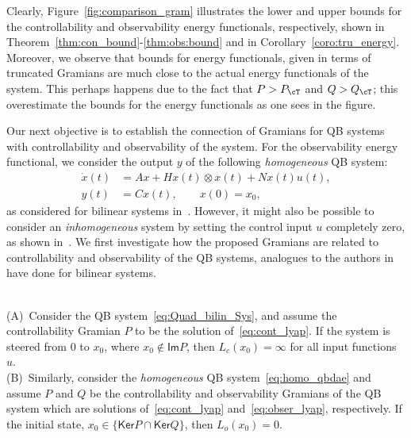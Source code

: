 \begin{example}
Clearly, Figure~\ref{fig:comparison_gram} illustrates the lower and upper bounds for the controllability and observability energy functionals, respectively, shown in Theorem~\ref{thm:con_bound}-\ref{thm:obs:bound} and in Corollary~\ref{coro:tru_energy}. Moreover, we observe that bounds for energy functionals, given in terms of truncated Gramians are much close to the actual energy functionals of the system. This perhaps happens due to the fact that $P > P_\cT$  and $Q > Q_\cT $; this  overestimate the bounds for the energy functionals as one sees in the figure.
 \end{example}
Our next objective is to establish the connection of Gramians for QB systems with controllability and observability of the system. For the observability energy functional, we consider the output $y$ of the following \emph{homogeneous}  QB system:
\begin{equation}\label{eq:homo_qbdae}
\begin{aligned}
\dot{x}(t)&= Ax + Hx(t)\otimes x(t) + Nx(t)u(t),\\
y(t) &= Cx(t),\qquad x(0) = x_0,
\end{aligned}
\end{equation}
as considered for bilinear systems in~\cite{morBenD11,enefungray98}. However, it might also be possible to consider an \emph{inhomogeneous} system by setting the control input $u$ completely zero, as shown in~\cite{morSch93}. We first investigate how the proposed Gramians are related to controllability and observability of the QB systems, analogues to the authors in \cite{morBenD11} have done for bilinear systems.
\def\im {\ensuremath{{\mathsf{Im}}}}
\def\ker {\ensuremath{{\mathsf{Ker}}}}
\def\rank {\ensuremath{{\mathsf{rank}}}}
\begin{theorem}\label{thm:kerPQ_dyn}
\mbox{}
\\(A)~Consider the QB system~\eqref{eq:Quad_bilin_Sys}, and assume the controllability Gramian $P$ to be the solution of~\eqref{eq:cont_lyap}. If the system is steered from $0$ to $x_0$, where $x_0 \not\in \im P$, then $L_c(x_0) = \infty$ for all input functions $u$.\\
(B)~Similarly,  consider the \emph{homogeneous} QB system~\eqref{eq:homo_qbdae} and assume $P$ and $Q$ be the controllability and observability Gramians of the QB system which are  solutions of~\eqref{eq:cont_lyap} and~\eqref{eq:obser_lyap}, respectively. If the initial state, $x_0 \in \{\ker P \cap \ker Q\}$, then $L_o(x_0) = 0$.
\end{theorem}
